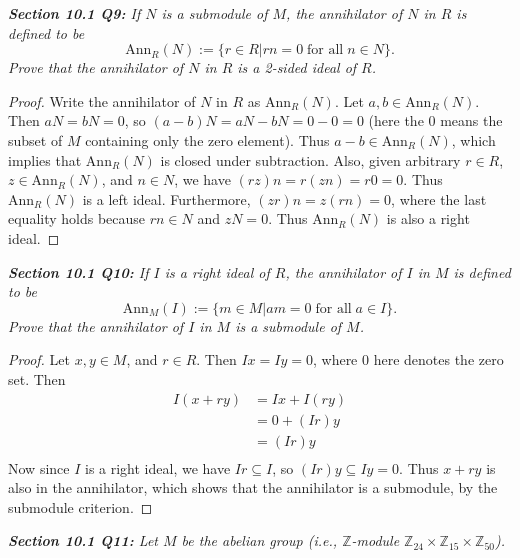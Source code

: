 \documentclass{article}
\begin{document}
\it \textbf{Section 10.1 Q9:} If $N$ is a submodule of $M$, the annihilator
  of $N$ in $R$ is defined to be
  \[\text{Ann}_R(N):= \{r\in R|rn=0\; \text{for all}\; n\in N\}.\]
  Prove that the annihilator of $N$ in $R$ is a 2-sided ideal of $R$.

  \begin{proof}
    Write the annihilator of $N$ in $R$ as $\text{Ann}_R(N)$. Let
    $a,b\in\text{Ann}_R(N)$. Then $aN=bN=0$, so $(a-b)N=aN-bN=0-0=0$ (here
    the 0 means the subset of $M$ containing only the zero element). Thus
    $a-b\in\text{Ann}_R(N)$, which implies that $\text{Ann}_R(N)$ is closed
    under subtraction. Also, given arbitrary $r\in R$,
    $z\in\text{Ann}_R(N)$, and $n\in N$, we have $(rz)n=r(zn)=r0=0$. Thus
    $\text{Ann}_R(N)$ is a left ideal. Furthermore, $(zr)n=z(rn)=0$, where
    the last equality holds because $rn\in N$ and $zN=0$. Thus
    $\text{Ann}_R(N)$ is also a right ideal.
  \end{proof}

\it \textbf{Section 10.1 Q10:} If $I$ is a right ideal of $R$, the
  annihilator of $I$ in $M$ is defined to be
  \[\text{Ann}_M(I):= \{m\in M|am=0\; \text{for all}\; a\in I\}.\]
  Prove that the annihilator of $I$ in $M$ is a submodule of $M$.

  \begin{proof}
    Let $x,y\in M$, and $r\in R$. Then $Ix=Iy=0$, where $0$ here denotes
    the zero set. Then
    \begin{align*}
      I(x+ry) &=Ix+I(ry) \\
      &=0+(Ir)y \\
      &=(Ir)y \\
    \end{align*}
    Now since $I$ is a right ideal, we have $Ir\subseteq I$, so
    $(Ir)y\subseteq Iy=0$. Thus $x+ry$ is also in the annihilator, which
    shows that the annihilator is a submodule, by the submodule criterion.
  \end{proof}

\it \textbf{Section 10.1 Q11:} Let $M$ be the abelian group (i.e.,
  $\mathbb{Z}$-module
  $\mathbb{Z}_{24}\times\mathbb{Z}_{15}\times\mathbb{Z}_{50}$).
\end{document}
